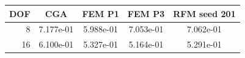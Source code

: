 \begin{tabular}{rcccc}
\toprule
DOF & CGA & FEM P1 & FEM P3 & RFM seed 201 \\
\midrule
8 & 7.177e-01 & 5.988e-01 & 7.053e-01 & 7.062e-01 \\
16 & 6.100e-01 & 5.327e-01 & 5.164e-01 & 5.291e-01 \\
\bottomrule
\end{tabular}
